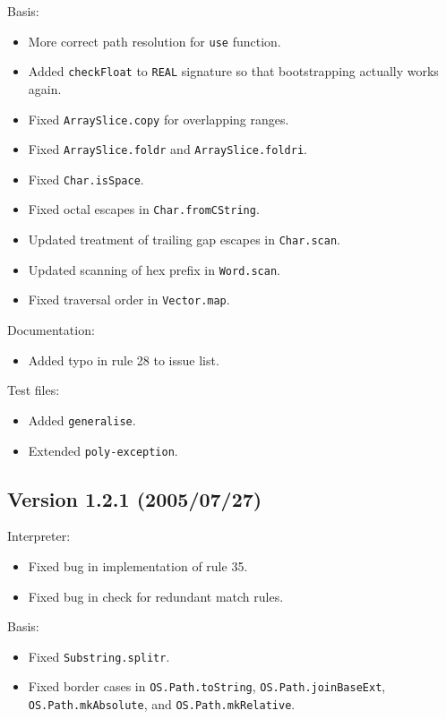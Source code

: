 \documentclass[twoside,titlepage]{article}
\begin{document}
\begin{appendix}
Basis:
\begin{itemize}[nolistsep]
\item More correct path resolution for {\tt use} function.
\item Added {\tt checkFloat} to {\tt REAL} signature so that bootstrapping actually works again.
\item Fixed {\tt ArraySlice.copy} for overlapping ranges.
\item Fixed {\tt ArraySlice.foldr} and {\tt ArraySlice.foldri}.
\item Fixed {\tt Char.isSpace}.
\item Fixed octal escapes in {\tt Char.fromCString}.
\item Updated treatment of trailing gap escapes in {\tt Char.scan}.
\item Updated scanning of hex prefix in {\tt Word.scan}.
\item Fixed traversal order in {\tt Vector.map}.
\end{itemize}

Documentation:
\begin{itemize}[nolistsep]
\item Added typo in rule 28 to issue list.
\end{itemize}

Test files:
\begin{itemize}[nolistsep]
\item Added {\tt generalise}.
\item Extended {\tt poly-exception}.
\end{itemize}

\subsection*{Version 1.2.1 (2005/07/27)}

Interpreter:
\begin{itemize}[nolistsep]
\item Fixed bug in implementation of rule 35.
\item Fixed bug in check for redundant match rules.
\end{itemize}

Basis:
\begin{itemize}[nolistsep]
\item Fixed {\tt Substring.splitr}.
\item Fixed border cases in {\tt OS.Path.toString}, {\tt OS.Path.joinBaseExt},\\ {\tt OS.Path.mkAbsolute}, and {\tt OS.Path.mkRelative}.
\end{itemize}


\end{appendix}
\end{document}
